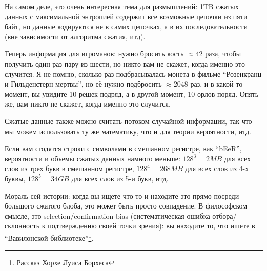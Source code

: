 На самом деле, это очень интересная тема для размышлений: 1TB сжатых данных с максимальной энтропией содержит все возможные цепочки из пяти байт,
но данные кодируются не в самих цепочках, а в их последовательности (вне зависимости от алгоритма сжатия, итд).

Теперь информация для игроманов: нужно бросить кость $\approx 42$ раза, чтобы получить один раз пару из шести, но никто вам не скажет, когда именно это случится.
Я не помню, сколько раз подбрасывалась монета в фильме ``Розенкранц и Гильденстерн мертвы'', но её нужно подбросить $\approx 2048$ раз, и в какой-то момент, вы увидите 10 решек подряд, а в другой момент,
10 орлов поряд.
Опять же, вам никто не скажет, когда именно это случится.

Сжатые данные также можно считать потоком случайной информации, так что мы можем использовать ту же математику, что и для теории вероятности, итд.

Если вам сгодятся строки с символами в смешанном регистре, как ``bEeR'', вероятности и объемы сжатых данных намного меньше:
$128^3=2MB$ для всех слов из трех букв в смешанном регистре,
$128^4=268MB$ для всех слов из 4-х буквы,
$128^5=34GB$ для всех слов из 5-и букв, итд.

Мораль сей истории: когда вы ищете что-то и находите это прямо посреди большого сжатого блоба, это может быть просто совпадение.
В философском смысле, это selection/confirmation bias (систематическая ошибка отбора/склонность к подтверждению своей точки зрения):
вы находите то, что ишете в ``Вавилонской библиотеке''\footnote{Рассказ Хорхе Луиса Борхеса}.

